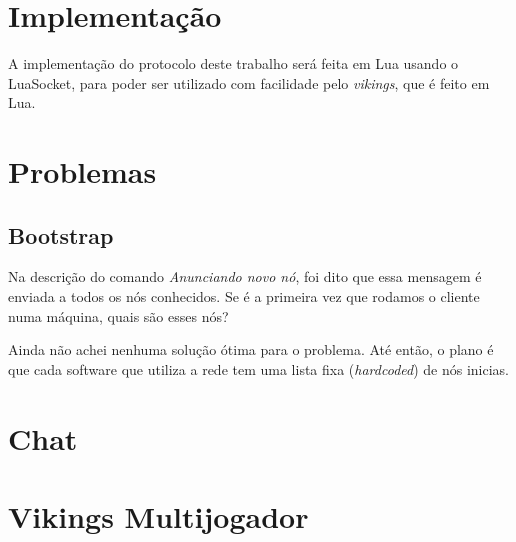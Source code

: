 \section{Implementação}
  A implementação do protocolo deste trabalho será feita em Lua usando o LuaSocket, %
  para poder ser utilizado com facilidade pelo \textit{vikings}, que é feito em Lua.

\section{Problemas}
  \subsection{Bootstrap}
    Na descrição do comando \textit{Anunciando novo nó}, foi dito que essa mensagem é enviada a
    todos os nós conhecidos. Se é a primeira vez que rodamos o cliente numa máquina, quais são
    esses nós?
    
    Ainda não achei nenhuma solução ótima para o problema. Até então, o plano é que cada software
    que utiliza a rede tem uma lista fixa (\textit{hardcoded}) de nós inicias.

\section{Chat}
\label{sec:rede:chat}

\section{Vikings Multijogador}
\label{sec:rede:vikings}
